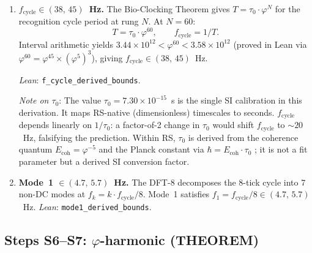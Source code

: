 \documentclass[11pt,a4paper]{article}
\begin{document}
\begin{enumerate}[resume,label=\textbf{S\arabic*.}]
  \item \textbf{$f_{\mathrm{cycle}} \in (38,\,45)$~Hz.}
    The Bio-Clocking Theorem gives $T = \tau_0 \cdot \varphi^N$
    for the recognition cycle period at rung $N$. At $N=60$:
    \begin{equation}
      \label{eq:period}
      T = \tau_0 \cdot \varphi^{60}, \qquad
      f_{\mathrm{cycle}} = 1/T.
    \end{equation}
    Interval arithmetic yields
    $3.44 \times 10^{12} < \varphi^{60} < 3.58 \times 10^{12}$
    (proved in Lean via $\varphi^{60} = \varphi^{45} \times
    (\varphi^5)^3$), giving $f_{\mathrm{cycle}} \in (38,\,45)$~Hz.

    \emph{Lean}: \texttt{f\_cycle\_derived\_bounds}.

    \emph{Note on $\tau_0$}: The value $\tau_0 = 7.30 \times
    10^{-15}$~s is the single SI calibration in this derivation.
    It maps RS-native (dimensionless) timescales to seconds.
    $f_{\mathrm{cycle}}$ depends linearly on $1/\tau_0$: a factor-of-2
    change in $\tau_0$ would shift $f_{\mathrm{cycle}}$ to
    $\sim\!20$~Hz, falsifying the prediction. Within RS, $\tau_0$
    is derived from the coherence quantum $E_{\mathrm{coh}} =
    \varphi^{-5}$ and the Planck constant via $\hbar =
    E_{\mathrm{coh}} \cdot \tau_0$
    \citep{washburn2025axioms}; it is not a fit parameter but a
    derived SI conversion factor.

  \item \textbf{Mode~1 $\in (4.7,\,5.7)$~Hz.}
    The DFT-8 decomposes the 8-tick cycle into 7 non-DC modes at
    $f_k = k \cdot f_{\mathrm{cycle}} / 8$. Mode~1 satisfies
    $f_1 = f_{\mathrm{cycle}}/8 \in (4.7,\,5.7)$~Hz.
    \emph{Lean}: \texttt{mode1\_derived\_bounds}.
\end{enumerate}

\subsection{Steps S6--S7: $\varphi$-harmonic (THEOREM)}
\end{document}
